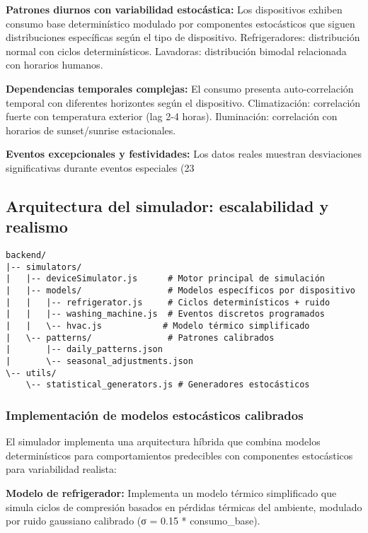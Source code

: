 \textbf{Patrones diurnos con variabilidad estocástica:}
Los dispositivos exhiben consumo base determinístico modulado por componentes estocásticos que siguen distribuciones específicas según el tipo de dispositivo. Refrigeradores: distribución normal con ciclos determinísticos. Lavadoras: distribución bimodal relacionada con horarios humanos.

\textbf{Dependencias temporales complejas:}
El consumo presenta auto-correlación temporal con diferentes horizontes según el dispositivo. Climatización: correlación fuerte con temperatura exterior (lag 2-4 horas). Iluminación: correlación con horarios de sunset/sunrise estacionales.

\textbf{Eventos excepcionales y festividades:}
Los datos reales muestran desviaciones significativas durante eventos especiales (23%

\subsection{Arquitectura del simulador: escalabilidad y realismo}

\begin{lstlisting}[caption=Arquitectura del simulador de dispositivos IoT]
backend/
|-- simulators/
|   |-- deviceSimulator.js      # Motor principal de simulación
|   |-- models/                 # Modelos específicos por dispositivo
|   |   |-- refrigerator.js     # Ciclos determinísticos + ruido
|   |   |-- washing_machine.js  # Eventos discretos programados
|   |   \-- hvac.js            # Modelo térmico simplificado
|   \-- patterns/               # Patrones calibrados
|       |-- daily_patterns.json
|       \-- seasonal_adjustments.json
\-- utils/
    \-- statistical_generators.js # Generadores estocásticos
\end{lstlisting}

\subsubsection{Implementación de modelos estocásticos calibrados}

El simulador implementa una arquitectura híbrida que combina modelos determinísticos para comportamientos predecibles con componentes estocásticos para variabilidad realista:

\textbf{Modelo de refrigerador:} Implementa un modelo térmico simplificado que simula ciclos de compresión basados en pérdidas térmicas del ambiente, modulado por ruido gaussiano calibrado (σ = 0.15 * consumo_base).

